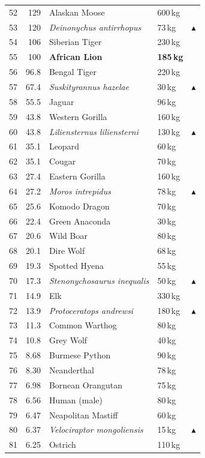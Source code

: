 \documentclass[11pt]{article}
\begin{document}
\begin{longtable}{rrllc}
52 & 129 & Alaskan Moose & 600\,kg &  \\
53 & 120 & \textit{Deinonychus antirrhopus} & 73\,kg & $\blacktriangle$ \\
54 & 106 & Siberian Tiger & 230\,kg &  \\
55 & 100 & \textbf{African Lion} & \textbf{185\,kg} &  \\
56 & 96.8 & Bengal Tiger & 220\,kg &  \\
57 & 67.4 & \textit{Suskityrannus hazelae} & 30\,kg & $\blacktriangle$ \\
58 & 55.5 & Jaguar & 96\,kg &  \\
59 & 43.8 & Western Gorilla & 160\,kg &  \\
60 & 43.8 & \textit{Liliensternus liliensterni} & 130\,kg & $\blacktriangle$ \\
61 & 35.1 & Leopard & 60\,kg &  \\
62 & 35.1 & Cougar & 70\,kg &  \\
63 & 27.4 & Eastern Gorilla & 160\,kg &  \\
64 & 27.2 & \textit{Moros intrepidus} & 78\,kg & $\blacktriangle$ \\
65 & 25.6 & Komodo Dragon & 70\,kg &  \\
66 & 22.4 & Green Anaconda & 30\,kg &  \\
67 & 20.6 & Wild Boar & 80\,kg &  \\
68 & 20.1 & Dire Wolf & 68\,kg &  \\
69 & 19.3 & Spotted Hyena & 55\,kg &  \\
70 & 17.3 & \textit{Stenonychosaurus inequalis} & 50\,kg & $\blacktriangle$ \\
71 & 14.9 & Elk & 330\,kg &  \\
72 & 13.9 & \textit{Protoceratops andrewsi} & 180\,kg & $\blacktriangle$ \\
73 & 11.3 & Common Warthog & 80\,kg &  \\
74 & 10.8 & Grey Wolf & 40\,kg &  \\
75 & 8.68 & Burmese Python & 90\,kg &  \\
76 & 8.30 & Neanderthal & 78\,kg &  \\
77 & 6.98 & Bornean Orangutan & 75\,kg &  \\
78 & 6.56 & Human (male) & 80\,kg &  \\
79 & 6.47 & Neapolitan Mastiff & 60\,kg &  \\
80 & 6.37 & \textit{Velociraptor mongoliensis} & 15\,kg & $\blacktriangle$ \\
81 & 6.25 & Ostrich & 110\,kg &  \\

\end{longtable}
\end{document}
